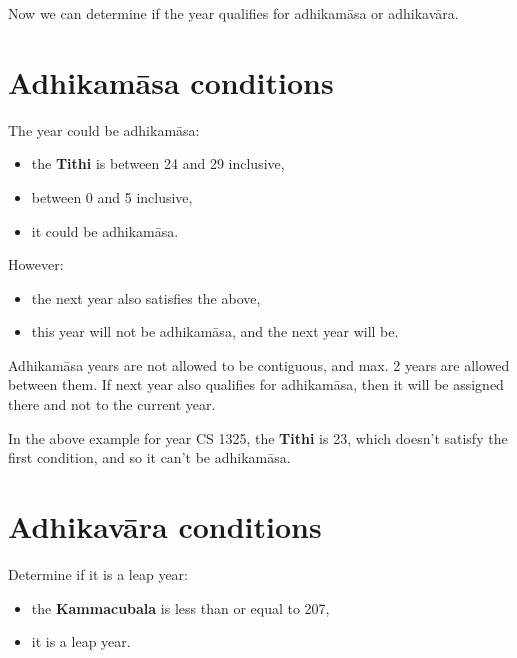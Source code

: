 \documentclass[11pt,oneside]{memoir-article}
\begin{document}
Now we can determine if the year qualifies for adhikamāsa or adhikavāra.

\clearpage

\section{Adhikamāsa conditions}
\label{sec-4-3}
\label{adhikamasa-years}


The year could be adhikamāsa:

\begin{itemize}
\item {} the \textbf{Tithi} is between 24 and 29 inclusive,
\item {} between 0 and 5 inclusive,
\item {} it could be adhikamāsa.
\end{itemize}

However:

\begin{itemize}
\item {} the next year also satisfies the above,
\item {} this year will not be adhikamāsa, and the next year will be.
\end{itemize}

Adhikamāsa years are not allowed to be contiguous, and max. 2 years are allowed
between them. If next year also qualifies for adhikamāsa, then it will be
assigned there and not to the current year.

In the above example for year CS 1325, the \textbf{Tithi} is 23, which doesn't satisfy
the first condition, and so it can't be adhikamāsa.

\section{Adhikavāra conditions}
\label{sec-4-4}
\label{adhikavara-years}


Determine if it is a leap year:

\begin{itemize}
\item {} the \textbf{Kammacubala} is less than or equal to 207,
\item {} it is a leap year.
\end{itemize}
\end{document}
